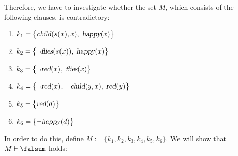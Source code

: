 Therefore, we have to investigate whether the set $M$, which consists of the following clauses, is contradictory:
\begin{enumerate}
\item $k_1 = \bigl\{ \textsl{child}(s(x),x),\; \textsl{happy}(x) \bigl\}$  
\item $k_2 = \bigl\{ \neg \textsl{flies}(s(x)),\; \textsl{happy}(x) \bigl\}$
\item $k_3 = \bigl\{ \neg \textsl{red}(x),\; \textsl{flies}(x) \bigl\}$
\item $k_4 = \bigl\{ \neg \textsl{red}(x),\; \neg \textsl{child}(y,x),\; \textsl{red}(y) \bigl\}$
\item $k_5 = \bigl\{ \textsl{red}(d) \bigl\}$ 
\item $k_6 = \bigl\{ \neg \textsl{happy}(d) \bigl\}$
\end{enumerate}
In order to do this, define $M := \bigl\{k_1,k_2,k_3,k_4,k_5,k_6\bigl\}$.
We will show that $M \vdash \falsum$ holds:
